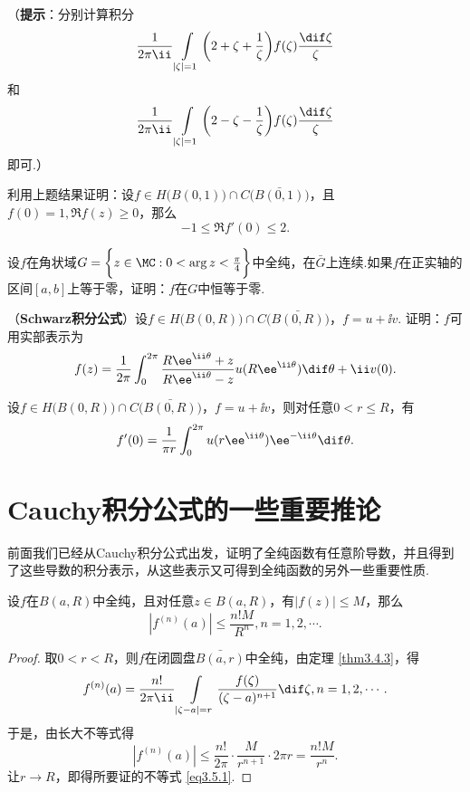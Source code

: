 \begin{xiti}
（\textbf{提示}：分别计算积分
\[\frac1{2\pi\ii}\int\limits_{|\zeta|=1}\bigg(2+\zeta+\frac1\zeta\bigg)f(\zeta)
\frac{\dif \zeta}\zeta\]
和
\[\frac1{2\pi\ii}\int\limits_{|\zeta|=1}\bigg(2-\zeta-\frac1\zeta\bigg)f(\zeta)
\frac{\dif \zeta}\zeta\]
即可.）
\item 利用上题结果证明：设$f\in H\big(B(0,1)\big)\cap C\big(\bar{B(0,1)}\big)$，且$f(0)=1,\Re f(z)\ge0$，那么
\[-1\le\Re f'(0)\le 2.\]
\item 设$f$在角状域$G=\bigg\{z\in\MC:0<\arg z<\frac\pi4\bigg\}$中全纯，在$\bar G$上连续.如果$f$在正实轴的区间$[a,b]$上等于零，证明：$f$在$G$中恒等于零.
\item （\textbf{Schwarz积分公式}）设$f\in H\big(B(0,R)\big)\cap C\big(\bar{B(0,R)}\big)$，$f=u+\ii v$. 证明：$f$可用实部表示为
    \[f(z)=\frac1{2\pi}\int_0^{2\pi}\frac{R\ee^{\ii\theta}+z}{R\ee^{\ii\theta}-z}
    u(R\ee^{\ii\theta})\dif \theta+\ii v(0).\]
\item 设$f\in H\big(B(0,R)\big)\cap C\big(\bar{B(0,R)}\big)$，$f=u+\ii v$，则对任意$0<r\le R$，有
    \[f'(0)=\frac1{\pi r}\int_0^{2\pi}u(r\ee^{\ii\theta})\ee^{-\ii\theta}\dif \theta.\]
\end{xiti}

\section{Cauchy积分公式的一些重要推论\label{sec3.5}}
前面我们已经从Cauchy积分公式出发，证明了全纯函数有任意阶导数，并且得到了这些导数的积分表示，从这些表示又可得到全纯函数的另外一些重要性质.
\begin{theorem}\label{thm3.5.1}
设$f$在$B(a,R)$中全纯，且对任意$z\in B(a,R)$，有$|f(z)|\le M$，那么
\begin{equation}\label{eq3.5.1}
|f^{(n)}(a)|\le\frac{n!M}{R^n},n=1,2,\cdots.
\end{equation}
\begin{proof}
取$0<r<R$，则$f$在闭圆盘$\bar{B(a,r)}$中全纯，由定理 \ref{thm3.4.3}，得
\begin{equation*}
  f^{(n)}(a)=\frac{n!}{2\pi\ii}\int\limits_{|\zeta-a|=r}\frac{f(\zeta)}{(\zeta-a)^{n+1}}\dif \zeta,n=1,2,\cdots.
\end{equation*}
于是，由长大不等式得
\[|f^{(n)}(a)|\le\frac{n!}{2\pi}\cdot\frac M{r^{n+1}}\cdot2\pi r=\frac{n!M}{r^n}.\]
让$r\to R$，即得所要证的不等式 \eqref{eq3.5.1}.
\end{proof}
\end{theorem}

